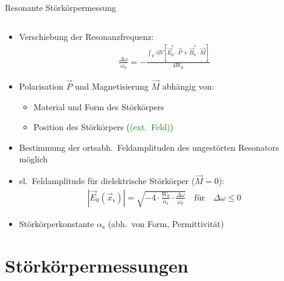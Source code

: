 \documentclass[12pt,xcolor=dvipsnames,professionalfonts]{beamer}
\newcommand{\todo}[1]{{\textcolor{Green}{(#1)}}}
\begin{document}
\begin{frame}{Resonante Störkörpermessung}
\begin{columns}[c,onlytextwidth]
	\end{columns}

\end{frame}

\begin{frame}
	\begin{itemize}
		\setlength\itemsep{1.25em}
		\item Verschiebung der Resonanzfrequenz:
		\begin{align*}
			\frac{\Delta \omega}{\omega_0} = -\frac{\int_{V} \, \mathrm{d}V \left[ \vec{E}_0^* \cdot \vec{P} + \vec{B}_0^* \cdot \vec{M} \right]}{4 W_0}
		\end{align*}
	
	\item Polarisation $\vec{P}$ und Magnetisierung $\vec{M}$ abhängig von:
		\begin{itemize}
			\setlength\itemsep{0.25em}
			\item Material und Form des Störkörpers
			\item Position des Störkörpers (\todo{ext.\ Feld})
		\end{itemize}
	\item Bestimmung der ortsabh.\ Feldamplituden des ungestörten Resonators möglich	
	\end{itemize}
\end{frame}

\begin{frame}
	\begin{itemize}
		\setlength\itemsep{1.25em}
		\item el.\ Feldamplitude für dielektrische Störkörper ($\vec{M} = 0$):
		\begin{align*}
			|\vec{E}_0(\vec{x}_\mathrm{s})| = \sqrt{- 4 \cdot \frac{W_0}{\alpha_\mathrm{s}} \cdot \frac{\Delta \omega}{\omega_0}} \quad \text{für} \quad \Delta \omega \leq 0
		\end{align*}
		
		\item Störkörperkonstante $\alpha_\mathrm{s}$ (abh.\ von Form, Permittivität)
	\end{itemize}
\end{frame}

\section{Störkörpermessungen}
\end{document}
